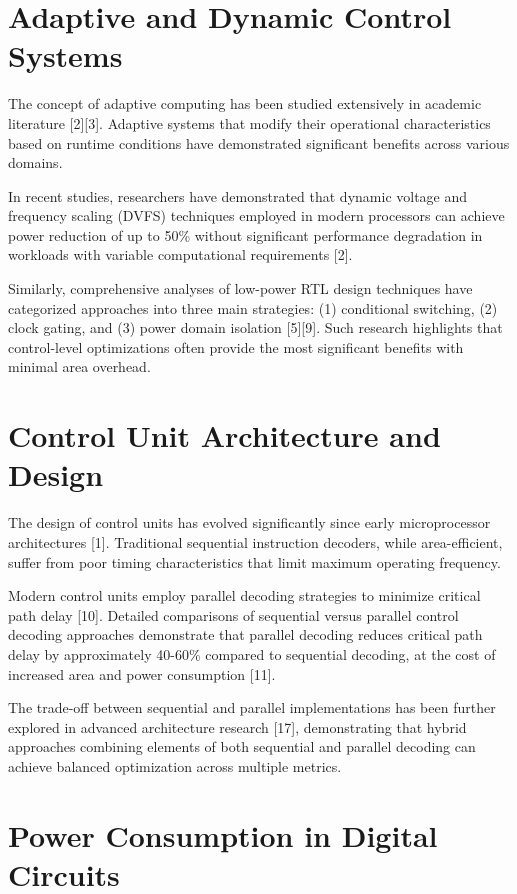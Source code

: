 \documentclass[15pt,a4paper]{report}
\begin{document}
\section{Adaptive and Dynamic Control Systems}

The concept of adaptive computing has been studied extensively in academic literature [2][3]. Adaptive systems that modify their operational characteristics based on runtime conditions have demonstrated significant benefits across various domains.

In recent studies, researchers have demonstrated that dynamic voltage and frequency scaling (DVFS) techniques employed in modern processors can achieve power reduction of up to 50\% without significant performance degradation in workloads with variable computational requirements [2].

Similarly, comprehensive analyses of low-power RTL design techniques have categorized approaches into three main strategies: (1) conditional switching, (2) clock gating, and (3) power domain isolation [5][9]. Such research highlights that control-level optimizations often provide the most significant benefits with minimal area overhead.

\section{Control Unit Architecture and Design}

The design of control units has evolved significantly since early microprocessor architectures [1]. Traditional sequential instruction decoders, while area-efficient, suffer from poor timing characteristics that limit maximum operating frequency.

Modern control units employ parallel decoding strategies to minimize critical path delay [10]. Detailed comparisons of sequential versus parallel control decoding approaches demonstrate that parallel decoding reduces critical path delay by approximately 40-60\% compared to sequential decoding, at the cost of increased area and power consumption [11].

The trade-off between sequential and parallel implementations has been further explored in advanced architecture research [17], demonstrating that hybrid approaches combining elements of both sequential and parallel decoding can achieve balanced optimization across multiple metrics.

\section{Power Consumption in Digital Circuits}
\end{document}
